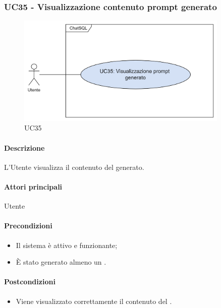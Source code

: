 \subsubsection{UC35 - Visualizzazione contenuto prompt generato}\label{UC35}

\begin{figure}[H]
  \centering
  \includegraphics[width=0.90\textwidth]{assets/uc35.png}
  \caption{UC35}
\end{figure}

\paragraph*{Descrizione}
L'Utente visualizza il contenuto del  generato.

\paragraph*{Attori principali}
Utente

\paragraph*{Precondizioni}
\begin{itemize}
  \item Il sistema è attivo e funzionante;
  \item È stato generato almeno un .
\end{itemize}

\paragraph*{Postcondizioni}
\begin{itemize}
  \item Viene visualizzato correttamente il contenuto del .
\end{itemize}


